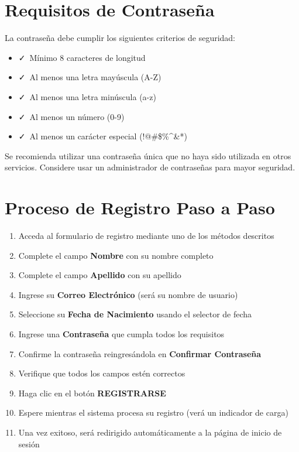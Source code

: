\documentclass[11pt,a4paper,twoside]{book}
\begin{document}
\section{Requisitos de Contraseña}

La contraseña debe cumplir los siguientes criterios de seguridad:

\begin{itemize}
    \item \faCheck\ Mínimo 8 caracteres de longitud
    \item \faCheck\ Al menos una letra mayúscula (A-Z)
    \item \faCheck\ Al menos una letra minúscula (a-z)
    \item \faCheck\ Al menos un número (0-9)
    \item \faCheck\ Al menos un carácter especial (!@\#\$\%\^{}\&*)
\end{itemize}

\begin{notebox}
Se recomienda utilizar una contraseña única que no haya sido utilizada en otros servicios. Considere usar un administrador de contraseñas para mayor seguridad.
\end{notebox}

\section{Proceso de Registro Paso a Paso}

\begin{enumerate}
    \item Acceda al formulario de registro mediante uno de los métodos descritos
    \item Complete el campo \textbf{Nombre} con su nombre completo
    \item Complete el campo \textbf{Apellido} con su apellido
    \item Ingrese su \textbf{Correo Electrónico} (será su nombre de usuario)
    \item Seleccione su \textbf{Fecha de Nacimiento} usando el selector de fecha
    \item Ingrese una \textbf{Contraseña} que cumpla todos los requisitos
    \item Confirme la contraseña reingresándola en \textbf{Confirmar Contraseña}
    \item Verifique que todos los campos estén correctos
    \item Haga clic en el botón \textbf{REGISTRARSE}
    \item Espere mientras el sistema procesa su registro (verá un indicador de carga)
    \item Una vez exitoso, será redirigido automáticamente a la página de inicio de sesión
\end{enumerate}
\end{document}
